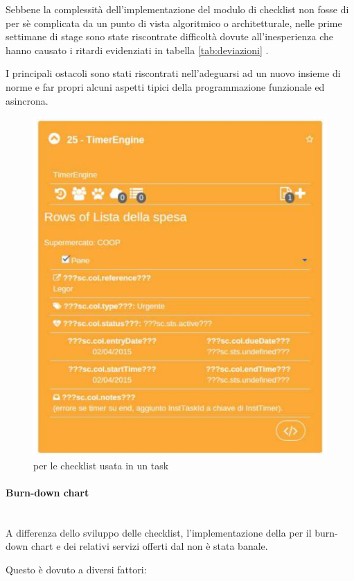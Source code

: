 Sebbene la complessità dell'implementazione del modulo di checklist non fosse
di per sè complicata da un punto di vista algoritmico o architetturale, nelle
prime settimane di stage sono state riscontrate difficoltà dovute
all'inesperienza che hanno causato i ritardi evidenziati in tabella
\ref{tab:deviazioni} .

I principali ostacoli sono stati riscontrati nell'adeguarsi ad un nuovo
insieme di norme e far propri alcuni aspetti tipici della programmazione
funzionale ed asincrona.

\begin{figure}[H]%
\centering
\includegraphics[width=.5\columnwidth]{immagini/taskConChecklist}
\caption{ per le checklist usata in un task}
\label{fig:cl-in-viewer}%
\end{figure}

\paragraph{Burn-down chart} \mbox{} \\

A differenza dello sviluppo delle checklist, l'implementazione della
 per il burn-down chart e dei relativi servizi offerti dal
\BKEND{} non è stata banale.

Questo è dovuto a diversi fattori:

